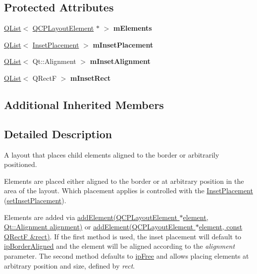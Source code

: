 \subsection*{Protected Attributes}
\begin{DoxyCompactItemize}
\item 
\mbox{\label{class_q_c_p_layout_inset_a1778266b94c739a6874101a1df7c6824}} 
\hyperlink{class_q_list}{Q\+List}$<$ \hyperlink{class_q_c_p_layout_element}{Q\+C\+P\+Layout\+Element} $\ast$ $>$ {\bfseries m\+Elements}
\item 
\mbox{\label{class_q_c_p_layout_inset_a43939f5c6442ee652b23d9fe6b388878}} 
\hyperlink{class_q_list}{Q\+List}$<$ \hyperlink{class_q_c_p_layout_inset_a8b9e17d9a2768293d2a7d72f5e298192}{Inset\+Placement} $>$ {\bfseries m\+Inset\+Placement}
\item 
\mbox{\label{class_q_c_p_layout_inset_a46f7eec552523efea663dd2d9bf7ed9f}} 
\hyperlink{class_q_list}{Q\+List}$<$ Qt\+::\+Alignment $>$ {\bfseries m\+Inset\+Alignment}
\item 
\mbox{\label{class_q_c_p_layout_inset_a9ff123727e9bec5a9d1a06e46e0d858b}} 
\hyperlink{class_q_list}{Q\+List}$<$ Q\+RectF $>$ {\bfseries m\+Inset\+Rect}
\end{DoxyCompactItemize}
\subsection*{Additional Inherited Members}


\subsection{Detailed Description}
A layout that places child elements aligned to the border or arbitrarily positioned. 

Elements are placed either aligned to the border or at arbitrary position in the area of the layout. Which placement applies is controlled with the \hyperlink{class_q_c_p_layout_inset_a8b9e17d9a2768293d2a7d72f5e298192}{Inset\+Placement} (\hyperlink{class_q_c_p_layout_inset_a63298830744d5d8c5345511c00fd2144}{set\+Inset\+Placement}).

Elements are added via \hyperlink{class_q_c_p_layout_inset_ad61529eb576af7f04dff94abb10c745a}{add\+Element(\+Q\+C\+P\+Layout\+Element $\ast$element, Qt\+::\+Alignment alignment)} or \hyperlink{class_q_c_p_layout_inset_a8ff61fbee4a1f0ff45c398009d9f1e56}{add\+Element(\+Q\+C\+P\+Layout\+Element $\ast$element, const Q\+Rect\+F \&rect)}. If the first method is used, the inset placement will default to \hyperlink{class_q_c_p_layout_inset_a8b9e17d9a2768293d2a7d72f5e298192a41ae236f04e42d7098e09fd49dffeb06}{ip\+Border\+Aligned} and the element will be aligned according to the {\itshape alignment} parameter. The second method defaults to \hyperlink{class_q_c_p_layout_inset_a8b9e17d9a2768293d2a7d72f5e298192a06556307ae5b8255297984219da4e8f4}{ip\+Free} and allows placing elements at arbitrary position and size, defined by {\itshape rect}.

